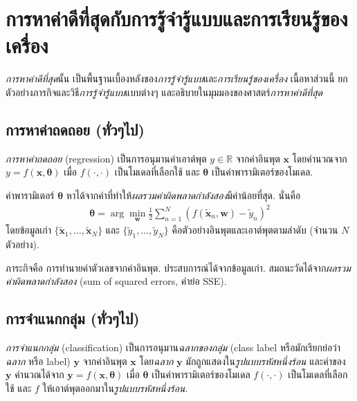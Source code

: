 \chapter{การหาค่าดีที่สุดกับการรู้จำรู้แบบและการเรียนรู้ของเครื่อง}
\label{opt optimization in PRML}

\textit{การหาค่าดีที่สุด}นั้น 
เป็นพื้นฐานเบื้องหลังของ\textit{การรู้จำรู้แบบ}และ\textit{การเรียนรู้ของเครื่อง}
เนื้อหาส่วนนี้ ยกตัวอย่างภารกิจและวิธี\textit{การรู้จำรู้แบบ}แบบต่างๆ และอธิบายในมุมมองของศาสตร์\textit{การหาค่าดีที่สุด}

\section{การหาค่าถดถอย (ทั่วๆไป)}

\textit{การหาค่าถดถอย} (regression)
เป็นการอนุมานค่าเอาต์พุต $y \in \mathbb{R}$ จากค่าอินพุต $\bm{x}$
โดยคำนวณจาก $y = f(\bm{x}, \bm{\theta})$ เมื่อ $f(\cdot, \cdot)$ เป็นโมเดลที่เลือกใช้ และ $\bm{\theta}$ เป็นค่าพารามิเตอร์ของโมเดล.

ค่าพารามิเตอร์ $\bm{\theta}$ หาได้จากค่าที่ทำให้\textit{ผลรวมค่าผิดพลาดกำลังสอง}มีค่าน้อยที่สุด.
นั่นคือ
\begin{eqnarray}
\bm{\theta} = \arg\min_{\bm{w}} \frac{1}{2} \sum_{n=1}^N \left( f(\bm{\tilde{x}}_n, \bm{w}) - \tilde{y}_n \right)^2
\label{eq: opt regression loss}
\end{eqnarray}
โดยข้อมูลเก่า $\{\bm{\tilde{x}}_1, \ldots, \bm{\tilde{x}}_N\}$ และ $\{\tilde{y}_1, \ldots, \tilde{y}_N\}$ คือตัวอย่างอินพุตและเอาต์พุตตามลำดับ (จำนวน $N$ ตัวอย่าง).

ภาระกิจคือ การทำนายค่าตัวเลขจากค่าอินพุต.
ประสบการณ์ได้จากข้อมูลเก่า.
สมถนะวัดได้จาก\textit{ผลรวมค่าผิดพลาดกำลังสอง} (sum of squared errors, คำย่อ SSE).

\section{การจำแนกกลุ่ม (ทั่วๆไป)}

\textit{การจำแนกกลุ่ม} (classification)
เป็นการอนุมาน\textit{ฉลากของกลุ่ม} (class label หรือมักเรียกย่อว่า \textit{ฉลาก} หรือ label) 
$\bm{y}$ จากค่าอินพุต $\bm{x}$
โดย\textit{ฉลาก} $\bm{y}$ มักถูกแสดงใน\textit{รูปแบบรหัสหนึ่งร้อน} 
และค่าของ $\bm{y}$ คำนวณได้จาก $\bm{y} = f(\bm{x}, \bm{\theta})$ เมื่อ 
$\bm{\theta}$ เป็นค่าพารามิเตอร์ของโมเดล
$f(\cdot, \cdot)$ เป็นโมเดลที่เลือกใช้ 
และ $f$ ให้เอาต์พุตออกมาใน\textit{รูปแบบรหัสหนึ่งร้อน}.

